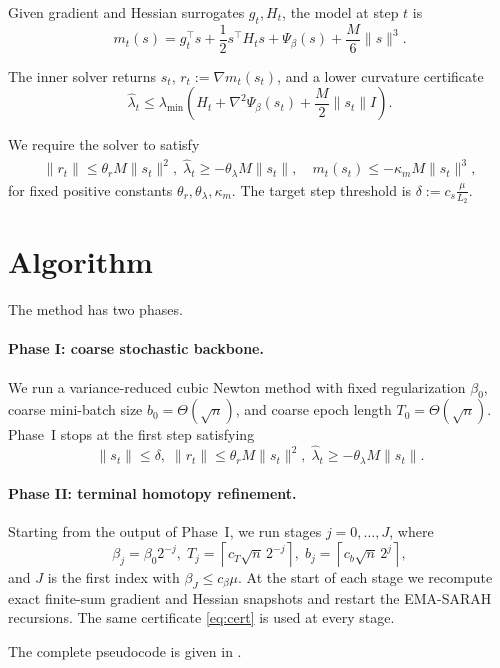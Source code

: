 \documentclass{article}
\theoremstyle{plain}
\theoremstyle{definition}
\theoremstyle{remark}
\begin{document}
Given gradient and Hessian surrogates \(g_t,H_t\), the model at step \(t\) is
\[
m_t(s)=g_t^\top s+\frac12 s^\top H_t s+\Psi_\beta(s)+\frac M6\|s\|^3.
\]

The inner solver returns $s_t$, $r_t:=\nabla m_t(s_t)$,
and a lower curvature certificate
\[
\textstyle \widehat\lambda_t \le
\lambda_{\min}\!\left(H_t+\nabla^2\Psi_\beta(s_t)+\frac M2\|s_t\|I\right).
\]

We require the solver to satisfy
\begin{align}\label{eq:solver}
\|r_t\|\le \theta_r M\|s_t\|^2,
\;
\widehat\lambda_t\ge -\theta_\lambda M\|s_t\|,\quad
m_t(s_t)\le -\kappa_m M\|s_t\|^3,
\end{align}
for fixed positive constants \(\theta_r,\theta_\lambda,\kappa_m\). The target step threshold is $
\delta:=c_s\frac{\mu}{L_2}$.

\section{Algorithm}\label{sec:algorithm}

The method has two phases.

\paragraph{Phase I: coarse stochastic backbone.}
We run a variance-reduced cubic Newton method with fixed regularization \(\beta_0\), coarse mini-batch size $b_0=\Theta(\sqrt n)$,
and coarse epoch length $
T_0=\Theta(\sqrt n)$.
Phase~I stops at the first step satisfying
\begin{equation}\label{eq:cert}
\|s_t\|\le \delta,\;
\|r_t\|\le \theta_r M\|s_t\|^2,\;
\widehat\lambda_t\ge -\theta_\lambda M\|s_t\|.
\end{equation}

\paragraph{Phase II: terminal homotopy refinement.}
Starting from the output of Phase~I, we run stages \(j=0,\dots,J\), where
\[
\beta_j=\beta_0 2^{-j},\;
T_j=\left\lceil c_T\sqrt n\,2^{-j}\right\rceil,\;
b_j=\left\lceil c_b\sqrt n\,2^j\right\rceil,
\]
and \(J\) is the first index with $
\beta_J\le c_\beta\mu$.
At the start of each stage we recompute exact finite-sum gradient and Hessian snapshots and restart the EMA-SARAH recursions. The same certificate \eqref{eq:cert} is used at every stage.

The complete pseudocode is given in .
\end{document}
